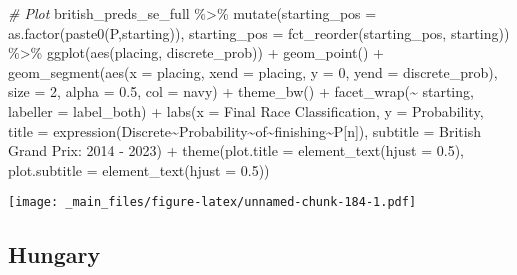 \documentclass[
]{book}
\newenvironment{Shaded}{\begin{snugshade}}{\end{snugshade}}
\newcommand{\AttributeTok}[1]{\textcolor[rgb]{0.77,0.63,0.00}{#1}}
\newcommand{\CommentTok}[1]{\textcolor[rgb]{0.56,0.35,0.01}{\textit{#1}}}
\newcommand{\DecValTok}[1]{\textcolor[rgb]{0.00,0.00,0.81}{#1}}
\newcommand{\FloatTok}[1]{\textcolor[rgb]{0.00,0.00,0.81}{#1}}
\newcommand{\FunctionTok}[1]{\textcolor[rgb]{0.00,0.00,0.00}{#1}}
\newcommand{\NormalTok}[1]{#1}
\newcommand{\SpecialCharTok}[1]{\textcolor[rgb]{0.00,0.00,0.00}{#1}}
\newcommand{\StringTok}[1]{\textcolor[rgb]{0.31,0.60,0.02}{#1}}
\begin{document}
\begin{Shaded}
\begin{Highlighting}[]
\CommentTok{\# Plot}
\NormalTok{british\_preds\_se\_full }\SpecialCharTok{\%\textgreater{}\%}
  \FunctionTok{mutate}\NormalTok{(}\AttributeTok{starting\_pos =} \FunctionTok{as.factor}\NormalTok{(}\FunctionTok{paste0}\NormalTok{(}\StringTok{\textquotesingle{}P\textquotesingle{}}\NormalTok{,starting)),}
         \AttributeTok{starting\_pos =} \FunctionTok{fct\_reorder}\NormalTok{(starting\_pos, starting)) }\SpecialCharTok{\%\textgreater{}\%}
  \FunctionTok{ggplot}\NormalTok{(}\FunctionTok{aes}\NormalTok{(placing, discrete\_prob)) }\SpecialCharTok{+}
  \FunctionTok{geom\_point}\NormalTok{() }\SpecialCharTok{+}
  \FunctionTok{geom\_segment}\NormalTok{(}\FunctionTok{aes}\NormalTok{(}\AttributeTok{x =}\NormalTok{ placing, }\AttributeTok{xend =}\NormalTok{ placing, }\AttributeTok{y =} \DecValTok{0}\NormalTok{, }\AttributeTok{yend =}\NormalTok{ discrete\_prob),}
               \AttributeTok{size =} \DecValTok{2}\NormalTok{, }\AttributeTok{alpha =} \FloatTok{0.5}\NormalTok{, }\AttributeTok{col =} \StringTok{\textquotesingle{}navy\textquotesingle{}}\NormalTok{) }\SpecialCharTok{+}
  \FunctionTok{theme\_bw}\NormalTok{() }\SpecialCharTok{+}
  \FunctionTok{facet\_wrap}\NormalTok{(}\SpecialCharTok{\textasciitilde{}}\NormalTok{ starting, }\AttributeTok{labeller =}\NormalTok{ label\_both) }\SpecialCharTok{+}
  \FunctionTok{labs}\NormalTok{(}\AttributeTok{x =} \StringTok{\textquotesingle{}Final Race Classification\textquotesingle{}}\NormalTok{,}
       \AttributeTok{y =} \StringTok{\textquotesingle{}Probability\textquotesingle{}}\NormalTok{,}
       \AttributeTok{title =} \FunctionTok{expression}\NormalTok{(Discrete}\SpecialCharTok{\textasciitilde{}}\NormalTok{Probability}\SpecialCharTok{\textasciitilde{}}\NormalTok{of}\SpecialCharTok{\textasciitilde{}}\NormalTok{finishing}\SpecialCharTok{\textasciitilde{}}\NormalTok{P[n]),}
       \AttributeTok{subtitle =} \StringTok{\textquotesingle{}British Grand Prix: 2014 {-} 2023\textquotesingle{}}\NormalTok{) }\SpecialCharTok{+}
  \FunctionTok{theme}\NormalTok{(}\AttributeTok{plot.title =} \FunctionTok{element\_text}\NormalTok{(}\AttributeTok{hjust =} \FloatTok{0.5}\NormalTok{),}
        \AttributeTok{plot.subtitle =} \FunctionTok{element\_text}\NormalTok{(}\AttributeTok{hjust =} \FloatTok{0.5}\NormalTok{)) }
\end{Highlighting}
\end{Shaded}

\texttt{[image: \_main\_files/figure-latex/unnamed-chunk-184-1.pdf]}

\hypertarget{hungary}{%
\subsection{Hungary}\label{hungary}}
\end{document}

